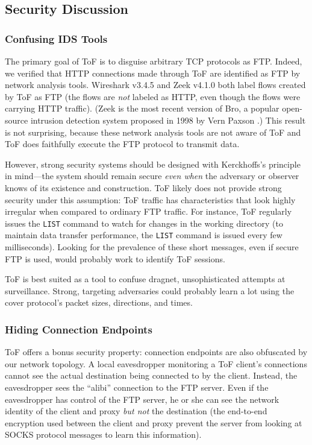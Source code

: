 \documentclass[letterpaper,twocolumn,11pt]{article}
\begin{document}
\subsection{Security Discussion} \label{subsec:security}

\subsubsection{Confusing IDS Tools}

The primary goal of ToF is to disguise arbitrary TCP protocols as FTP. Indeed,
we verified that HTTP connections made through ToF are identified as FTP by
network analysis tools. Wireshark v3.4.5 and Zeek v4.1.0 both label flows
created by ToF as FTP (the flows are \emph{not} labeled as HTTP, even though
the flows were carrying HTTP traffic).  (Zeek is the most recent version of
Bro, a popular open-source intrusion detection system proposed in 1998 by Vern
Paxson \cite{bro}.) This result is not surprising, because these network
analysis tools are not aware of ToF and ToF does faithfully execute the FTP
protocol to transmit data.

However, strong security systems should be designed with Kerckhoffs's principle
in mind---the system should remain secure \emph{even when} the adversary or
observer knows of its existence and construction. ToF likely does not provide
strong security under this assumption: ToF traffic has characteristics that
look highly irregular when compared to ordinary FTP traffic. For instance, ToF
regularly issues the \texttt{LIST} command to watch for changes in the working
directory (to maintain data transfer performance, the \texttt{LIST} command is
issued every few milliseconds). Looking for the prevalence of these short
messages, even if secure FTP is used, would probably work to identify ToF
sessions.

ToF is best suited as a tool to confuse dragnet, unsophisticated attempts at
surveillance. Strong, targeting adversaries could probably learn a lot using
the cover protocol's packet sizes, directions, and times.

\subsubsection{Hiding Connection Endpoints}

ToF offers a bonus security property: connection endpoints are also obfuscated
by our network topology. A local eavesdropper monitoring a ToF client's
connections cannot see the actual destination being connected to by the client.
Instead, the eavesdropper sees the ``alibi'' connection to the FTP server.
Even if the eavesdropper has control of the FTP server, he or she can see the
network identity of the client and proxy \emph{but not} the destination (the
end-to-end encryption used between the client and proxy prevent the server from
looking at SOCKS protocol messages to learn this information).
\end{document}
